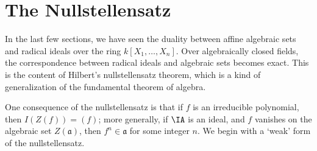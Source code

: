 %
%


\section{The Nullstellensatz}

In the last few sections, we have seen the duality between affine algebraic sets and radical ideals over the ring $k[X_1, \dots, X_n]$. Over algebraically closed fields, the correspondence between radical ideals and algebraic sets becomes exact. This is the content of Hilbert's nullstellensatz theorem, which is a kind of generalization of the fundamental theorem of algebra.



One consequence of the nullstellensatz is that if $f$ is an irreducible polynomial, then $I(Z(f)) = (f)$; more generally, if $\IA$ is an ideal, and $f$ vanishes on the algebraic set $Z(\mathfrak{a})$, then $f^n \in \mathfrak{a}$ for some integer $n$. We begin with a `weak' form of the nullstellensatz.

